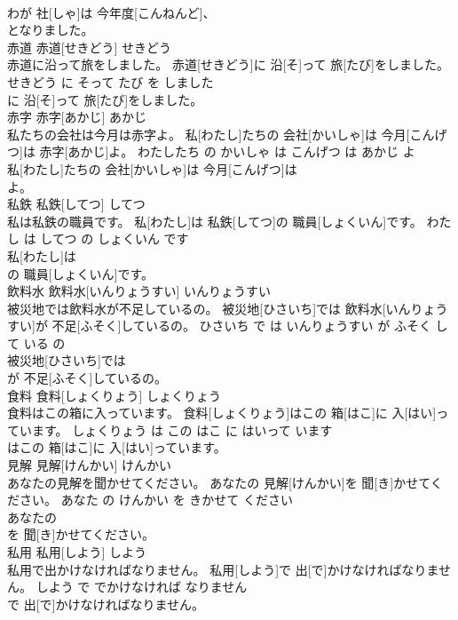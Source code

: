 \documentclass[8pt]{extreport}
\begin{document}
\begin{CJK}{UTF8}{min}
\\	わが 社[しゃ]は 今年度[こんねんど]、
\\	となりました。			
\\	赤道	赤道[せきどう]	せきどう	
\\	赤道に沿って旅をしました。	赤道[せきどう]に 沿[そ]って 旅[たび]をしました。	せきどう に そって たび を しました	
\\	に 沿[そ]って 旅[たび]をしました。			
\\	赤字	赤字[あかじ]	あかじ	
\\	私たちの会社は今月は赤字よ。	私[わたし]たちの 会社[かいしゃ]は 今月[こんげつ]は 赤字[あかじ]よ。	わたしたち の かいしゃ は こんげつ は あかじ よ	
\\	私[わたし]たちの 会社[かいしゃ]は 今月[こんげつ]は
\\	よ。			
\\	私鉄	私鉄[してつ]	してつ	
\\	私は私鉄の職員です。	私[わたし]は 私鉄[してつ]の 職員[しょくいん]です。	わたし は してつ の しょくいん です	
\\	私[わたし]は
\\	の 職員[しょくいん]です。			
\\	飲料水	飲料水[いんりょうすい]	いんりょうすい	
\\	被災地では飲料水が不足しているの。	被災地[ひさいち]では 飲料水[いんりょうすい]が 不足[ふそく]しているの。	ひさいち で は いんりょうすい が ふそく して いる の	
\\	被災地[ひさいち]では
\\	が 不足[ふそく]しているの。			
\\	食料	食料[しょくりょう]	しょくりょう	
\\	食料はこの箱に入っています。	食料[しょくりょう]はこの 箱[はこ]に 入[はい]っています。	しょくりょう は この はこ に はいって います	
\\	はこの 箱[はこ]に 入[はい]っています。			
\\	見解	見解[けんかい]	けんかい	
\\	あなたの見解を聞かせてください。	あなたの 見解[けんかい]を 聞[き]かせてください。	あなた の けんかい を きかせて ください	
\\	あなたの
\\	を 聞[き]かせてください。			
\\	私用	私用[しよう]	しよう	
\\	私用で出かけなければなりません。	私用[しよう]で 出[で]かけなければなりません。	しよう で でかけなければ なりません	
\\	で 出[で]かけなければなりません。			

\end{CJK}
\end{document}

